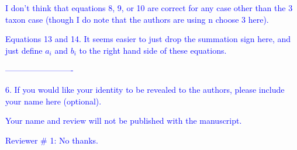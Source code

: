 \documentclass[11pt]{letter}
\begin{document}
\begin{letter}{}


\textcolor{blue}{I don't think that equations 8, 9, or 10 are correct for any case other than the 3 taxon case (though I do note that the authors are using n choose 3 here).}



\textcolor{blue}{Equations 13 and 14. It seems easier to just drop the summation sign here, and just define $a_i$ and $b_i$ to the right hand side of these equations.}



\textcolor{blue}{-------------------------}

\textcolor{blue}{6. If you would like your identity to be revealed to the authors, please include your name here (optional).}


\textcolor{blue}{Your name and review will not be published with the manuscript.}


\textcolor{blue}{Reviewer $\#$ 1: No thanks.}



\end{letter}
\end{document}

